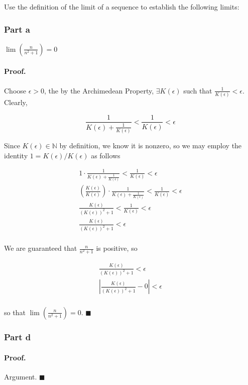 \documentclass[paper=a4, fontsize=11pt]{scrartcl} %
\numberwithin{equation}{section} %
\numberwithin{figure}{section} %
\numberwithin{table}{section} %
\begin{document}
Use the definition of the limit of a sequence to establish the following limits:

\subsubsection*{Part a}

$\lim(\frac{n}{n^2 + 1}) = 0$

\newcommand{\kep}{K(\epsilon)}
\paragraph{Proof.} Choose $\epsilon > 0$, the by the Archimedean Property, $\exists \kep$ such that $\frac{1}{\kep} < \epsilon$. Clearly,

\begin{equation}
\frac{1}{\kep + \frac{1}{\kep}} < \frac{1}{\kep} < \epsilon
\end{equation}

Since $\kep \in \mathbb{N}$ by definition, we know it is nonzero, so we may employ the identity $1 = \kep/\kep$ as follows

\begin{gather*}
1\cdot\frac{1}{\kep + \frac{1}{\kep}} < \frac{1}{\kep} < \epsilon \\
\left(\frac{\kep}{\kep}\right)\cdot\frac{1}{\kep + \frac{1}{\kep}} < \frac{1}{\kep} < \epsilon \\
\frac{\kep}{(\kep)^2 + 1} < \frac{1}{\kep} < \epsilon \\
\frac{\kep}{(\kep)^2 + 1} < \epsilon \\
\end{gather*}

We are guaranteed that $\frac{n}{n^2 + 1}$ is positive, so 

\begin{gather*}
\frac{\kep}{(\kep)^2 + 1} < \epsilon \\
\left|\frac{\kep}{(\kep)^2 + 1} - 0\right| < \epsilon \\
\end{gather*}

so that $\lim(\frac{n}{n^2 + 1}) = 0$. $\blacksquare$\\
\subsubsection*{Part d}
\paragraph{Proof.} Argument. $\blacksquare$\\
\end{document}

